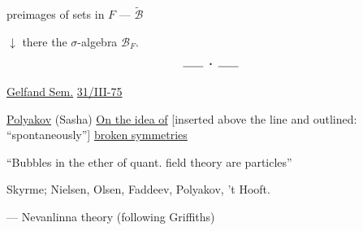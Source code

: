 preimages of sets in \(F\) — \(\widetilde{\mathcal B}\)

\(\downarrow\) there the \(\sigma\)-algebra \(\mathcal B_F\).
\[\rule{1.8em}{.4pt}\;\boldsymbol{\cdot}\;\rule{1.8em}{.4pt}\]


\underline{Gelfand Sem.} \underline{31/III-75}

\underline{Polyakov} (Sasha)
\underline{On the idea of} [inserted above the line and outlined: “spontaneously”] \underline{broken symmetries}

“Bubbles in the ether of quant. field theory are particles”

Skyrme; Nielsen, Olsen, Faddeev, Polyakov, ’t Hooft.

 — Nevanlinna theory (following Griffiths)



